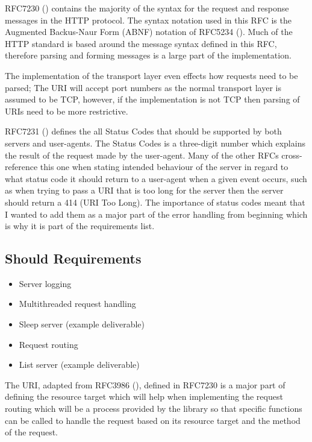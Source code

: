 \documentclass[12pt, a4paper]{article}
\begin{document}
RFC7230 (\cite{rfc7230}) contains the majority of the syntax for the request and response messages
in the HTTP protocol. The syntax notation used in this RFC is the Augmented Backus-Naur Form (ABNF)
notation of RFC5234 (\cite{rfc5234}). Much of the HTTP standard is based around the message syntax
defined in this RFC, therefore parsing and forming messages is a large part of the implementation.

The implementation of the transport layer even effects how requests need to be parsed; The URI
will accept port numbers as the normal transport layer is assumed to be TCP, however, if the
implementation is not TCP then parsing of URIs need to be more restrictive.

RFC7231 (\cite{rfc7231}) defines the all Status Codes that should be supported by both servers and
user-agents. The Status Codes is a three-digit number which explains the result of the request made
by the user-agent. Many of the other RFCs cross-reference this one when stating intended behaviour
of the server in regard to what status code it should return to a user-agent when a given event
occurs, such as when trying to pass a URI that is too long for the server then the server should
return a 414 (URI Too Long). The importance of status codes meant that I wanted to add them as a
major part of the error handling from beginning which is why it is part of the requirements list.

\subsection{Should Requirements}

\begin{itemize}
    \item\label{sreq:server-logging} Server logging
    \item\label{sreq:multithreaded-request-handling} Multithreaded request handling 
    \item\label{sreq:example-sleep-server} Sleep server (example deliverable)
    \item\label{sreq:request-routing} Request routing
    \item\label{mreq:example-list-server} List server (example deliverable)
\end{itemize}

The URI, adapted from RFC3986 (\cite{rfc3986}), defined in RFC7230 is a major part of defining 
the resource target which will help when implementing the request routing which will be a process 
provided by the library so that specific functions can be called to handle the request based on its
resource target and the method of the request.
\end{document}
